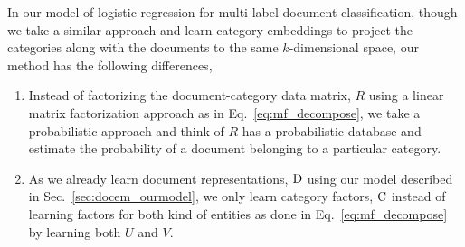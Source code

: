 In our model of logistic regression for multi-label document classification, though we take a similar approach and learn category embeddings to project the categories along with the documents to the same $k$-dimensional space, our method has the following differences,
\begin{enumerate}
\item Instead of factorizing the document-category data matrix, $R$ using a linear matrix factorization approach as in Eq.~\ref{eq:mf_decompose}, we take a probabilistic approach and think of $R$ has a probabilistic database and estimate the probability of a document belonging to a particular category.

\item As we already learn document representations, $\mathrm{D}$ using our model described in Sec.~\ref{sec:docem_ourmodel}, we only learn category factors, $\mathrm{C}$ instead of learning factors for both kind of entities as done in Eq.~\ref{eq:mf_decompose} by learning both $U$ and $V$.
\end{enumerate}

